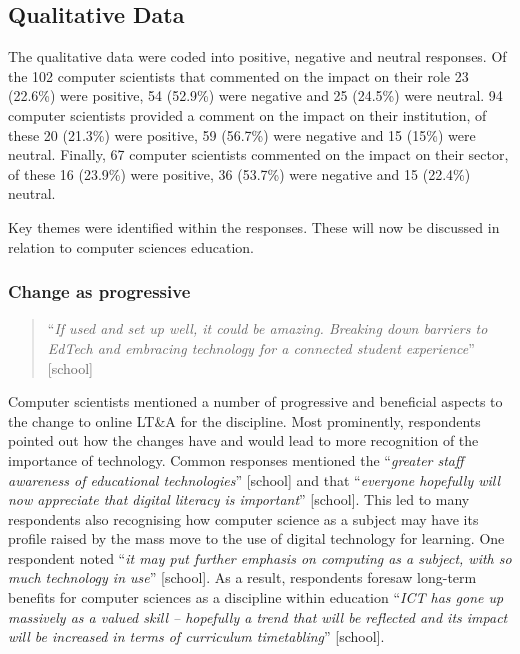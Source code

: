 \documentclass[sigconf]{acmart}
\begin{document}
\subsection{Qualitative Data}\label{qualdata}

The qualitative data were coded into positive, negative and neutral
responses. Of the 102 computer scientists that commented on the impact
on their role 23 (22.6\%) were positive, 54 (52.9\%) were negative and
25 (24.5\%) were neutral.  94 computer scientists provided a comment
on the impact on their institution, of these 20 (21.3\%) were
positive, 59 (56.7\%) were negative and 15 (15\%) were
neutral. Finally, 67 computer scientists commented on the impact on
their sector, of these 16 (23.9\%) were positive, 36 (53.7\%) were
negative and 15 (22.4\%) neutral.

Key themes were identified within the responses. These will now be
discussed in relation to computer sciences education.

\subsubsection*{Change as progressive}

\begin{quotation}
``{\emph{If used and set up well, it could be amazing.  Breaking down
barriers to EdTech and embracing technology for a connected student
experience}}'' [school]
\end{quotation}

Computer scientists mentioned a number of progressive and beneficial
aspects to the change to online LT\&A for the discipline. Most
prominently, respondents pointed out how the changes have and would
lead to more recognition of the importance of technology. Common
responses mentioned the ``{\emph{greater staff awareness of
educational technologies}}” [school] and that ``{\emph{everyone
hopefully will now appreciate that digital literacy is important}}''
[school]. This led to many respondents also recognising how computer
science as a subject may have its profile raised by the mass move to
the use of digital technology for learning. One respondent noted
``{\emph{it may put further emphasis on computing as a subject, with
so much technology in use}}'' [school]. As a result, respondents
foresaw long-term benefits for computer sciences as a discipline
within education ``{\emph{ICT has gone up massively as a valued skill
-- hopefully a trend that will be reflected and its impact will be
increased in terms of curriculum timetabling}}'' [school].
\end{document}
